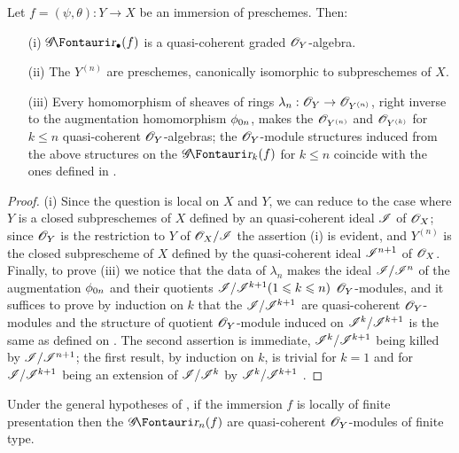\begin{proposition}[16.1.5]
\label{IV.16.1.5}
Let $f = (\psi, \theta): Y \to X$ be an immersion of preschemes.
Then:
\begin{enumerate}
  \item[{\rm(i)}] $\shGr_\bullet(f)$ is a quasi-coherent graded $\mathscr{O}_Y$-algebra.
  \item[{\rm(ii)}] The $Y^{(n)}$ are preschemes, canonically isomorphic to subpreschemes of $X$.
  \item[{\rm(iii)}] Every homomorphism of sheaves of rings $\lambda_n: \sh{O}_Y \to \sh{O}_{Y^{(n)}}$, right inverse to the augmentation homomorphism $\phi_{0n}$, makes the $\mathscr{O}_{Y^{(n)}}$ and $\mathscr{O}_{Y^{(k)}}$ for $k\leq n$ quasi-coherent $\mathscr{O}_Y$-algebras;
  the $\mathscr{O}_Y$-module structures induced from the above structures on the $\shGr_k(f)$ for $k \leq n$ coincide with the ones defined in .
\end{enumerate}
\end{proposition}

\begin{proof}
(i) Since the question is local on $X$ and $Y$, we can reduce to the case where $Y$ is a closed subpreschemes of $X$ defined by an quasi-coherent ideal $\mathscr{I}$ of $\mathscr{O}_X$;
since $\mathscr{O}_Y$ is the restriction to $Y$ of $\mathscr{O}_X/\mathscr{I}$ the assertion (i) is evident, and $Y^{(n)}$ is the closed subprescheme of $X$ defined by the quasi-coherent ideal $\mathscr{I}^{n+1}$ of $\mathscr{O}_X$.
Finally, to prove (iii) we notice that the data of $\lambda_n$ makes the ideal $\mathscr{I}/\mathscr{I}^n$ of the augmentation $\phi_{0n}$ and their quotients $\mathscr{I}/\mathscr{I}^{k+1} (1\leqslant k \leqslant n)$ $\mathscr{O}_Y$-modules, and it suffices to prove by induction on $k$ that the $\mathscr{I}/\mathscr{I}^{k+1}$ are quasi-coherent $\mathscr{O}_Y$-modules and the structure of quotient $\mathscr{O}_Y$-module induced on $\mathscr{I}^k/\mathscr{I}^{k+1}$ is the same as defined on .
The second assertion is immediate, $\mathscr{I}^k/\mathscr{I}^{k+1}$ being killed by $\mathscr{I}/\mathscr{I}^{n+1}$;
the first result, by induction on $k$, is trivial for $k=1$ and for $\mathscr{I}/\mathscr{I}^{k+1}$ being an extension of $\mathscr{I}/\mathscr{I}^{k}$ by $\mathscr{I}^k/\mathscr{I}^{k+1}$ .
\end{proof}

\begin{corollary}[16.1.6]
\label{IV.16.1.6}
Under the general hypotheses of , if the immersion $f$ is locally of finite presentation then the $\shGr_n(f)$ are quasi-coherent $\mathscr{O}_Y$-modules of finite type.
\end{corollary}

